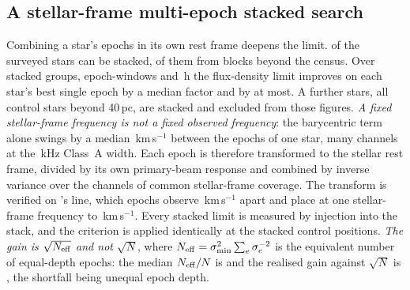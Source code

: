 \subsection{A stellar-frame multi-epoch stacked search}
\label{sec:stack}

Combining a star's epochs in its own rest frame deepens the limit.
\SxStkStarCensus{} of the surveyed stars can be stacked,
\SttNStkOneEb{} of them from blocks beyond the census. Over \SyStkNGroup{}
stacked groups, \SyStkNEpochComb{} epoch-windows and \SyStkHours\,h the
flux-density limit improves on each star's best single epoch by a median factor \SyStkGainMed{} and by \SyStkGainMax{} at most. A further
\SxStkStarOutside{} stars, all control stars beyond 40\,pc, are stacked and
excluded from those figures. \emph{A fixed stellar-frame frequency is not a
fixed observed frequency}: the barycentric term alone swings by a median
\StkVcorrSwingMed\,km\,s$^{-1}$ between the epochs of one star, many channels
at the \StkRefChanKHz\,kHz Class~A width. Each epoch is therefore transformed
to the stellar rest frame, divided by its own primary-beam response and
combined by inverse variance over the channels of common stellar-frame
coverage. The transform is verified
on \StkPersistLineStar's line, which \StkRegNEpoch{} epochs observe
\StkRegTopoKms\,km\,s$^{-1}$ apart and place at one stellar-frame frequency
to \FrEpochStelKms\,km\,s$^{-1}$. Every stacked limit
is measured by injection into the stack, and the criterion is applied
identically at the stacked control positions. \emph{The gain is
$\sqrt{N_{\rm eff}}$ and not $\sqrt{N}$}, where
$N_{\rm eff}=\sigma_{\min}^{2}\sum_e\sigma_e^{-2}$ is the equivalent number of
equal-depth epochs: the median $N_{\rm eff}/N$ is \StkNeffFrac{} and the
realised gain against $\sqrt{N}$ is \StkGainVsN, the shortfall being unequal
epoch depth.

